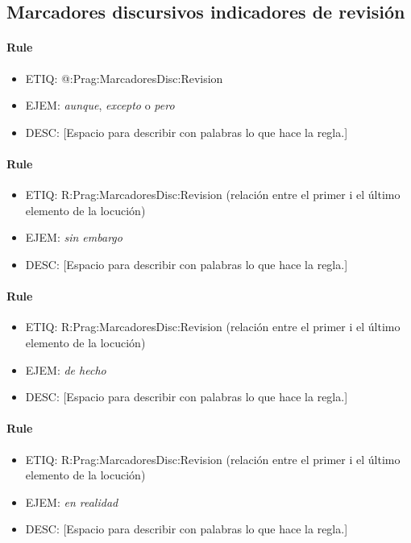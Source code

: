 \documentclass[11pt]{report}
\begin{document}
\subsection{Marcadores discursivos indicadores de revisión}
\paragraph*{Rule}
\begin{itemize}
\item ETIQ: @:Prag:MarcadoresDisc:Revision
\item EJEM: \emph{aunque}, \emph{excepto} o \emph{pero}
\item DESC: [Espacio para describir con palabras lo que hace la regla.]
\end{itemize}

\paragraph*{Rule}
\begin{itemize}
\item ETIQ: R:Prag:MarcadoresDisc:Revision (relación entre el primer i el último elemento de la locución)
\item EJEM: \emph{sin embargo}
\item DESC: [Espacio para describir con palabras lo que hace la regla.]
\end{itemize}

\paragraph*{Rule}
\begin{itemize}
\item ETIQ: R:Prag:MarcadoresDisc:Revision (relación entre el primer i el último elemento de la locución)
\item EJEM: \emph{de hecho}
\item DESC: [Espacio para describir con palabras lo que hace la regla.]
\end{itemize}

\paragraph*{Rule}
\begin{itemize}
\item ETIQ: R:Prag:MarcadoresDisc:Revision (relación entre el primer i el último elemento de la locución)
\item EJEM: \emph{en realidad}
\item DESC: [Espacio para describir con palabras lo que hace la regla.]
\end{itemize}
\end{document}

